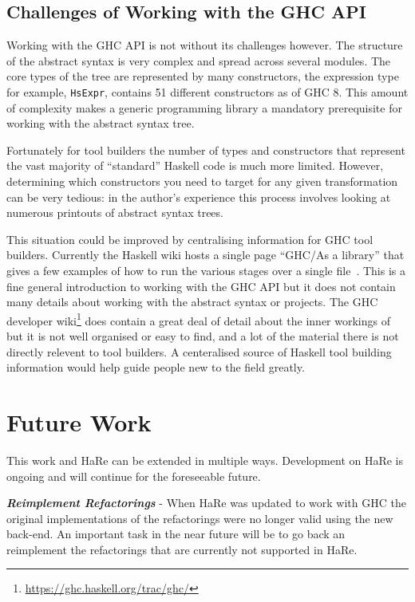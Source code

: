 \subsection{Challenges of Working with the GHC API}

Working with the GHC API is not without its challenges however. The structure of the abstract syntax is very complex and spread across several modules. The core types of the tree are represented by many constructors, the expression type for example, \texttt{HsExpr}, contains 51 different constructors as of GHC 8. This amount of complexity makes a generic programming library a mandatory prerequisite for working with the abstract syntax tree. 

Fortunately for tool builders the number of types and constructors that represent the vast majority of ``standard'' Haskell code is much more limited. However, determining which constructors you need to target for any given transformation can be very tedious: in the author's experience this process involves looking at numerous printouts of abstract syntax trees. 

This situation could be improved by centralising information for GHC tool builders. Currently the Haskell wiki hosts a single page ``GHC/As a library'' that gives a few examples of how to run the various stages over a single file~\citep{ghcAsALibrary}. This is a fine general introduction to working with the GHC API but it does not contain many details about working with the abstract syntax or projects. The GHC developer wiki\footnote{\url{https://ghc.haskell.org/trac/ghc/}} does contain a great deal of detail about the inner workings of but it is not well organised or easy to find, and a lot of the material there is not directly relevent to tool builders. A centeralised source of Haskell tool building information would help guide people new to the field greatly.

\section{Future Work}
This work and HaRe can be extended in multiple ways. Development on HaRe is ongoing and will continue for the foreseeable future. 

\textit{\textbf{Reimplement Refactorings}} - When HaRe was updated to work with GHC the original implementations of the refactorings were no longer valid using the new back-end. An important task in the near future will be to go back an reimplement the refactorings that are currently not supported in HaRe. 

